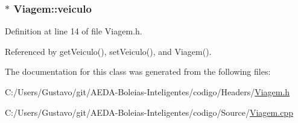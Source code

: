 \hypertarget{class_viagem_aee9386a44de6b6afb11faff59331f7b5}{
\subsubsection[{veiculo}]{$\ast$ Viagem\+::veiculo\hspace{0.3cm}{\ttfamily [private]}}}\label{class_viagem_aee9386a44de6b6afb11faff59331f7b5}


Definition at line 14 of file Viagem.\+h.



Referenced by get\+Veiculo(), set\+Veiculo(), and Viagem().



The documentation for this class was generated from the following files\+:\begin{DoxyCompactItemize}
\item 
C\+:/\+Users/\+Gustavo/git/\+A\+E\+D\+A-\/\+Boleias-\/\+Inteligentes/codigo/\+Headers/\hyperlink{_viagem_8h}{Viagem.\+h}\item 
C\+:/\+Users/\+Gustavo/git/\+A\+E\+D\+A-\/\+Boleias-\/\+Inteligentes/codigo/\+Source/\hyperlink{_viagem_8cpp}{Viagem.\+cpp}\end{DoxyCompactItemize}
